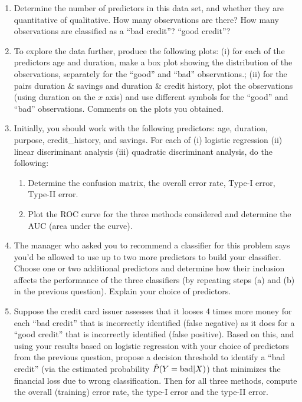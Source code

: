 \documentclass[11pt]{article}
\begin{document}
\begin{enumerate}
\item Determine the number of predictors in this data set, and whether they are quantitative of qualitative. How many observations are there? How many observations are classified as a ``bad credit''? ``good credit''? 
\item To explore the data further, produce the following plots: (i) for each of the predictors age and duration, make a box plot showing the distribution of the observations, separately for the ``good'' and ``bad'' observations.; (ii) for the pairs duration \& savings and duration \& credit history, plot the observations (using duration on the $x$ axis) and use different symbols for the ``good'' and ``bad'' observations. Comments on the plots you obtained.
\item Initially, you should work with the following predictors: age, duration, purpose, credit\_history, and savings. For each of (i) logistic regression (ii) linear discriminant analysis (iii) quadratic discriminant analysis, do the following:
  \begin{enumerate}
  \item Determine the confusion matrix, the overall error rate, Type-I error, Type-II error.
  \item Plot the ROC curve for the three methods considered and determine the AUC (area under the curve).
  \end{enumerate}
\item The manager who asked you to recommend a classifier for this problem says you'd be allowed to use up to two more predictors to build your classifier. Choose one or two additional predictors and determine how their inclusion affects the performance of the three classifiers (by repeating steps (a) and (b) in the previous question). Explain your choice of predictors.
\item Suppose the credit card issuer assesses that it looses 4 times more money for each ``bad credit'' that is incorrectly identified (false negative)  as it does for a ``good credit'' that is incorrectly identified (false positive). Based on this, and using your results based on logistic regression with your choice of predictors from the previous question, propose a decision threshold  to identify a ``bad credit'' (via the estimated probability $\hat{P}(Y={\rm bad}|X)$) that minimizes the financial loss due to wrong classification. Then for all three methods, compute the overall (training) error rate, the type-I error and the type-II error. %

\end{enumerate}
\end{document}
